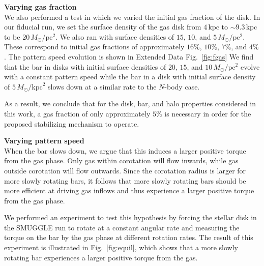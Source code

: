 \documentclass[twoside]{natureprintstyle}
\newcommand{\Nbody}{$N$-body}
\newcommand{\Msun}{\ensuremath{M_{\odot}}}
\begin{document}
\vspace{12pt}

\noindent
{\bf Varying gas fraction}
\\
\noindent
We also performed a test in which we varied the initial gas fraction of the
disk. In our fiducial run, we set the surface density of the gas disk from
$4\,\textrm{kpc}$ to $\sim9.3\,\textrm{kpc}$ to be $20\,\Msun/\textrm{pc}^2$.
We also ran with surface densities of $15$, $10$, and
$5\,\Msun/\textrm{pc}^2$. These correspond to initial gas fractions of
approximately $16\%$, $10\%$, $7\%$, and $4\%$. The pattern speed evolution is
shown in Extended Data Fig.~\ref{fig:fgas} We find that the bar in disks with
initial surface densities of $20$, $15$, and $10\,\Msun/\textrm{pc}^2$ evolve
with a constant pattern speed while the bar in a disk with initial surface
density of $5\,\Msun/\textrm{kpc}^2$ slows down at a similar rate to the \Nbody{} case.

As a result, we conclude that for the disk, bar, and halo properties
considered in this work, a gas fraction of only approximately $5\%$ is
necessary in order for the proposed stabilizing mechanism to operate.

\vspace{12pt}

\noindent
{\bf Varying pattern speed}
\\
\noindent
When the bar slows down, we argue that this induces a larger positive torque
from the gas phase. Only gas within corotation will flow inwards, while gas
outside corotation will flow outwards.\cite{2011MNRAS.415.1027H} Since the
corotation radius is larger for more slowly rotating bars, it follows that
more slowly rotating bars should be more efficient at driving gas inflows and
thus experience a larger positive torque from the gas phase.

We performed an experiment to test this hypothesis by forcing the stellar disk
in the SMUGGLE run to rotate at a constant angular rate and measuring the
torque on the bar by the gas phase at different rotation rates. The result of
this experiment is illustrated in Fig.~\ref{fig:equil}, which shows that a more
slowly rotating bar experiences a larger positive torque from the gas. 

\vspace{12pt}
\end{document}
